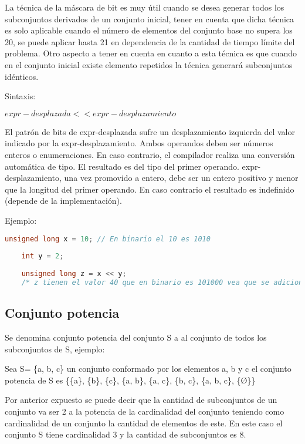 La técnica de la máscara de bit es muy útil cuando se desea generar todos los subconjuntos derivados de un conjunto inicial, tener en cuenta que dicha técnica es solo aplicable cuando el número de elementos del conjunto base no supera los 20, se puede aplicar hasta 21 en dependencia de la cantidad de tiempo límite del problema. Otro aspecto a tener en cuenta en cuanto a esta técnica es que cuando en el conjunto inicial existe elemento repetidos la técnica generará subconjuntos idénticos.

Sintaxis:

$ expr-desplazada << expr-desplazamiento $ 

El patrón de bits de expr-desplazada sufre un desplazamiento izquierda del valor indicado por la expr-desplazamiento. Ambos operandos deben ser números enteros o enumeraciones. En caso contrario, el compilador realiza una conversión automática de tipo. El resultado es del tipo del primer operando. expr-desplazamiento, una vez promovido a entero, debe ser un entero positivo y menor que la longitud del primer operando. En caso contrario el resultado es indefinido (depende de la implementación).

Ejemplo:

\lstset{language=C++, breaklines=true, basicstyle=\footnotesize}
\begin{lstlisting}[language=C++]
	unsigned long x = 10; // En binario el 10 es 1010
	
	int y = 2;
	
	unsigned long z = x << y;  
	/* z tienen el valor 40 que en binario es 101000 vea que se adiciono dos ceros al final que son los desplazamientos.*/
\end{lstlisting} 

\subsection{Conjunto potencia}

Se denomina conjunto potencia del conjunto S a al conjunto de todos los subconjuntos de S, ejemplo:

Sea S= \{a, b, c\} un conjunto conformado por los elementos a, b y c el conjunto potencia de  S es \{\{a\}, \{b\}, \{c\}, \{a, b\}, \{a, c\}, \{b, c\}, \{a, b, c\}, \{Ø\}\}  

Por anterior expuesto se puede decir que la cantidad de subconjuntos de un conjunto va ser 2 a la potencia de la cardinalidad del conjunto teniendo como cardinalidad de un conjunto la cantidad de elementos de este. En este caso el conjunto S tiene cardinalidad 3 y la cantidad de subconjuntos es 8.